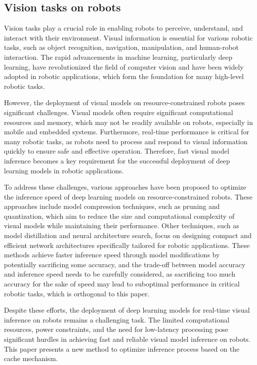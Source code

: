 \subsection{Vision tasks on robots}
Vision tasks play a crucial role in enabling robots to perceive, understand, and interact with their environment. 
Visual information is essential for various robotic tasks, such as object recognition, navigation, manipulation, and human-robot interaction. 
The rapid advancements in machine learning, particularly deep learning, have revolutionized the field of computer vision and have been widely adopted in robotic applications, which form the foundation for many high-level robotic tasks.

However, the deployment of visual models on resource-constrained robots poses significant challenges. 
Visual models often require significant computational resources and memory, which may not be readily available on robots, especially in mobile and embedded systems. 
Furthermore, real-time performance is critical for many robotic tasks, as robots need to process and respond to visual information quickly to ensure safe and effective operation. 
Therefore, fast visual model inference becomes a key requirement for the successful deployment of deep learning models in robotic applications.

To address these challenges, various approaches have been proposed to optimize the inference speed of deep learning models on resource-constrained robots. 
These approaches include model compression techniques, such as pruning and quantization, which aim to reduce the size and computational complexity of visual models while maintaining their performance. 
Other techniques, such as model distillation and neural architecture search, focus on designing compact and efficient network architectures specifically tailored for robotic applications. 
These methods achieve faster inference speed through model modifications by potentially sacrificing some accuracy, and the trade-off between model accuracy and inference speed needs to be carefully considered, as sacrificing too much accuracy for the sake of speed may lead to suboptimal performance in critical robotic tasks, which is orthogonal to this paper.

Despite these efforts, the deployment of deep learning models for real-time visual inference on robots remains a challenging task.
The limited computational resources, power constraints, and the need for low-latency processing pose significant hurdles in achieving fast and reliable visual model inference on robots. 
This paper presents a new method to optimize inference process based on the cache mechanism.


